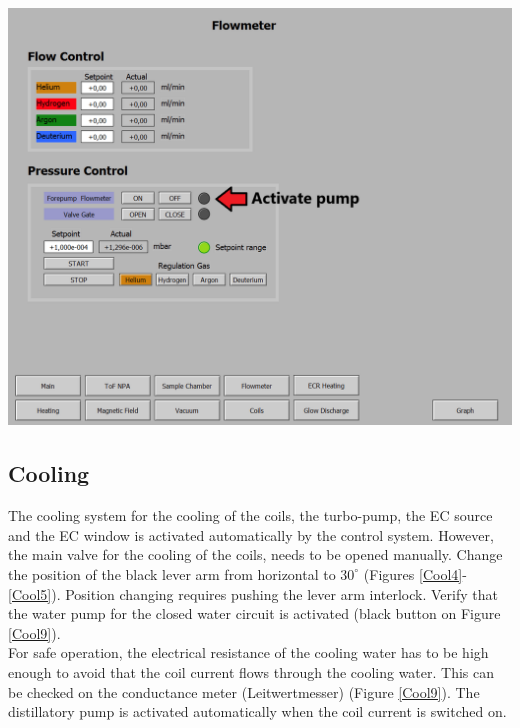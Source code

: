 \documentclass[fleqn,a4paper,20pt]{article}
\begin{document}
	
		\includegraphics[width=\linewidth]{Gas2}
		
	
\newpage
\subsection{Cooling}

The cooling system for the cooling of the coils, the turbo-pump, the EC source and the EC window is activated automatically by the control system. However, the main valve for the cooling of the coils, needs to be opened manually. Change the position of the black lever arm from horizontal to $30^\circ$ (Figures \ref{Cool4}-\ref{Cool5}). Position changing requires pushing the lever arm interlock. Verify that the water pump for the closed water circuit is activated (black button on Figure \ref{Cool9}).\\

For safe operation, the electrical resistance of the cooling water has to be high enough to avoid that the coil current flows through the cooling water. This can be checked on the conductance meter (Leitwertmesser) (Figure \ref{Cool9}). The distillatory pump  is activated automatically when the coil current is switched on.\\
\end{document}
